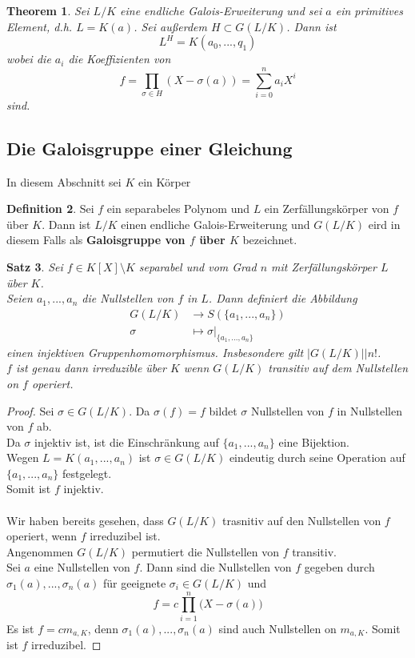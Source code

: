 \documentclass[10pt,a4paper]{article}
\newcommand{\abs}[1]{\left|#1\right|}
\theoremstyle{plain}
\newtheorem{theorem}{Theorem}[section]
\newtheorem{satz}[theorem]{Satz}
\theoremstyle{definition}
\newtheorem{definition}[theorem]{Definition}
\theoremstyle{remark}
\begin{document}
	\begin{theorem}
		Sei $L/K$ eine endliche Galois-Erweiterung und sei $a$ ein primitives Element, d.h. $L=K(a)$. Sei außerdem $H\subset G(L/K)$. Dann ist\[L^H=K(a_0,...,q_1)\]
		wobei die $a_i$ die Koeffizienten von
		\[f=\prod_{\sigma\in H}(X-\sigma(a))=\sum_{i=0}^{n}a_iX^i\]
		sind.
	\end{theorem}

	
	\subsection{Die Galoisgruppe einer Gleichung}
	In diesem Abschnitt sei $K$ ein Körper
	\begin{definition}
		Sei $f$ ein separabeles Polynom und $L$ ein Zerfällungskörper von $f$ über $K$. Dann ist $L/K$ einen endliche Galois-Erweiterung und $G(L/K)$ eird in diesem Falls als \textbf{Galoisgruppe von $f$ über $K$} bezeichnet.
	\end{definition}

	\begin{satz}
		Sei $f\in K[X]\setminus K$ separabel und vom Grad $n$ mit Zerfällungskörper $L$ über $K$.\\
		Seien $a_1,...,a_n$ die Nullstellen von $f$ in $L$. Dann definiert die Abbildung
		\begin{align*}
		G(L/K)&\to S(\{a_1,...,a_n\})\\
		\sigma&\mapsto\sigma|_{\{a_1,...,a_n\}}
		\end{align*}
		einen injektiven Gruppenhomomorphismus. Insbesondere gilt $\abs{G(L/K)}|n!$.\\
		$f$ ist genau dann irreduzible über $K$ wenn $G(L/K)$ transitiv auf dem Nullstellen on $f$ operiert.
	\end{satz}
	\begin{proof}
		Sei $\sigma\in G(L/K)$. Da $\sigma(f)=f$ bildet $\sigma$ Nullstellen von $f$ in Nullstellen von $f$ ab.\\
		Da $\sigma$ injektiv ist, ist die Einschränkung auf $\{a_1,...,a_n\}$ eine Bijektion.\\
		Wegen $L=K(a_1,...,a_n)$ ist $\sigma\in G(L/K)$ eindeutig durch seine Operation auf $\{a_1,...,a_n\}$ festgelegt.\\
		Somit ist $f$ injektiv.\\
		\\
		Wir haben bereits gesehen, dass $G(L/K)$ trasnitiv auf den Nullstellen von $f$ operiert, wenn $f$ irreduzibel ist.\\
		Angenommen $G(L/K)$ permutiert die Nullstellen von $f$ transitiv.\\
		Sei $a$ eine Nullstellen von $f$. Dann sind die Nullstellen von $f$ gegeben durch $\sigma_1(a),...,\sigma_n(a)$ für geeignete $\sigma_i\in G(L/K)$ und
		\[f=c\prod_{i=1}^{n}\big(X-\sigma(a)\big)\]
		Es ist $f=cm_{a,K}$, denn $\sigma_1(a),...,\sigma_n(a)$ sind auch Nullstellen on $m_{a,K}$. Somit ist $f$ irreduzibel.
	\end{proof}
\end{document}
